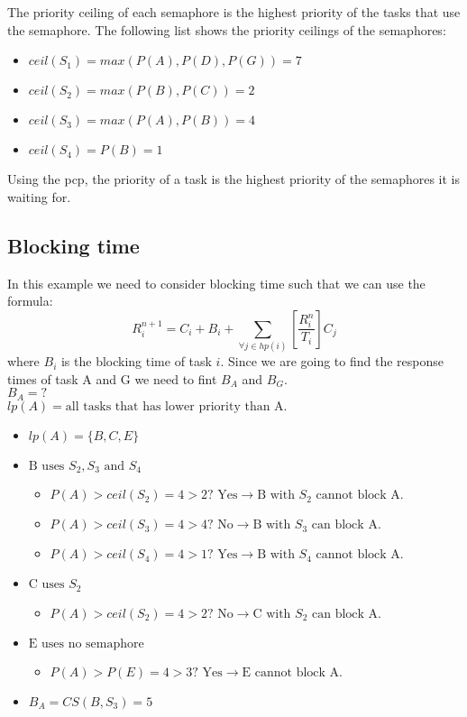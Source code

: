 The priority ceiling of each semaphore is the highest priority of the tasks that use the semaphore. The following list shows the priority ceilings of the semaphores:

\begin{itemize}
    \item $ceil(S_1) = max(P(A), P(D), P(G)) = 7$
    \item $ceil(S_2) = max(P(B), P(C)) = 2$
    \item $ceil(S_3) = max(P(A), P(B)) = 4$
    \item $ceil(S_4) = P(B) = 1$
\end{itemize}

Using the \ac{pcp}, the priority of a task is the highest priority of the semaphores it is waiting for.

\subsection{\textbf{Blocking time}}
    In this example we need to consider blocking time such that we can use the formula:
    $$R_i^{n+1} = C_i + B_i + \sum\limits_{\forall j \in hp(i)} \left[\frac{R_i^n}{T_i}\right] C_j$$
    where $B_i$ is the blocking time of task $i$. Since we are going to find the response times of task A and G we need to fint $B_A$ and $B_G$. \\

    $B_A = ?$\\
    $lp(A) = \text{all tasks that has lower priority than A.}$

    \begin{itemize}
        \item $lp(A) = \{B, C, E\}$
        \item $\text{B uses } S_2, S_3 \text{ and } S_4$
        \begin{itemize}
            \item $P(A)>ceil(S_2) = 4>2? \text{ Yes} \rightarrow \text{B with } S_2 \text{ cannot block A.}$
            \item $P(A)>ceil(S_3) = 4>4? \text{ No} \rightarrow \text{B with } S_3 \text{ can block A.}$
            \item $P(A)>ceil(S_4) = 4>1? \text{ Yes} \rightarrow \text{B with } S_4 \text{ cannot block A.}$
        \end{itemize}
        \item $\text{C uses } S_2$
        \begin{itemize}
            \item $P(A)>ceil(S_2) = 4>2? \text{ No} \rightarrow \text{C with } S_2 \text{ can block A.}$
        \end{itemize}
        \item $\text{E uses no semaphore}$ 
        \begin{itemize}
            \item $P(A)>P(E) = 4>3? \text{ Yes} \rightarrow \text{E cannot block A.}$
        \end{itemize}
        \item $B_A = CS(B,S_3) = 5$\\
    \end{itemize}

